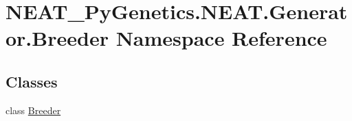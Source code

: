 \hypertarget{namespaceNEAT__PyGenetics_1_1NEAT_1_1Generator_1_1Breeder}{}\section{N\+E\+A\+T\+\_\+\+Py\+Genetics.\+N\+E\+A\+T.\+Generator.\+Breeder Namespace Reference}
\label{namespaceNEAT__PyGenetics_1_1NEAT_1_1Generator_1_1Breeder}
\subsection*{Classes}
\begin{DoxyCompactItemize}
\item 
class \hyperlink{classNEAT__PyGenetics_1_1NEAT_1_1Generator_1_1Breeder_1_1Breeder}{Breeder}
\end{DoxyCompactItemize}
